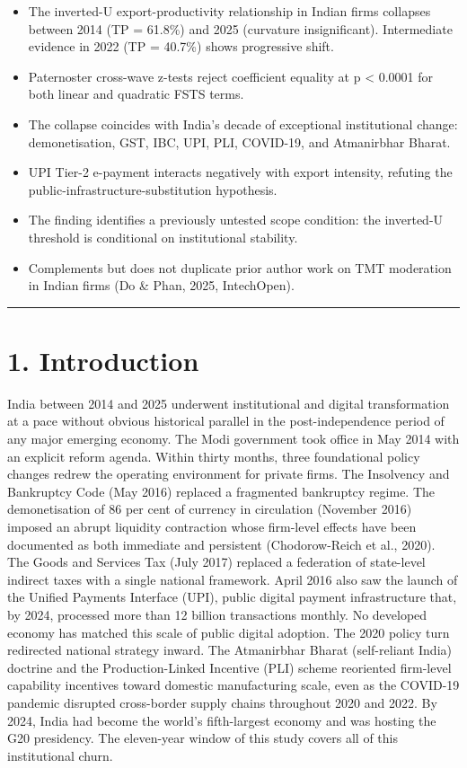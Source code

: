 \documentclass[
  12pt]{article}
\begin{document}
\begin{itemize}
\item
  The inverted-U export-productivity relationship in Indian firms
  collapses between 2014 (TP = 61.8\%) and 2025 (curvature
  insignificant). Intermediate evidence in 2022 (TP = 40.7\%) shows
  progressive shift.
\item
  Paternoster cross-wave z-tests reject coefficient equality at p
  \textless{} 0.0001 for both linear and quadratic FSTS terms.
\item
  The collapse coincides with India's decade of exceptional
  institutional change: demonetisation, GST, IBC, UPI, PLI, COVID-19,
  and Atmanirbhar Bharat.
\item
  UPI Tier-2 e-payment interacts negatively with export intensity,
  refuting the public-infrastructure-substitution hypothesis.
\item
  The finding identifies a previously untested scope condition: the
  inverted-U threshold is conditional on institutional stability.
\item
  Complements but does not duplicate prior author work on TMT moderation
  in Indian firms (Do \& Phan, 2025, IntechOpen).
\end{itemize}

\begin{center}\rule{0.5\linewidth}{0.5pt}\end{center}

\hypertarget{introduction}{%
\section{1. Introduction}\label{introduction}}

India between 2014 and 2025 underwent institutional and digital
transformation at a pace without obvious historical parallel in the
post-independence period of any major emerging economy. The Modi
government took office in May 2014 with an explicit reform agenda.
Within thirty months, three foundational policy changes redrew the
operating environment for private firms. The Insolvency and Bankruptcy
Code (May 2016) replaced a fragmented bankruptcy regime. The
demonetisation of 86 per cent of currency in circulation (November 2016)
imposed an abrupt liquidity contraction whose firm-level effects have
been documented as both immediate and persistent (Chodorow-Reich et al.,
2020). The Goods and Services Tax (July 2017) replaced a federation of
state-level indirect taxes with a single national framework. April 2016
also saw the launch of the Unified Payments Interface (UPI), public
digital payment infrastructure that, by 2024, processed more than 12
billion transactions monthly. No developed economy has matched this
scale of public digital adoption. The 2020 policy turn redirected
national strategy inward. The Atmanirbhar Bharat (self-reliant India)
doctrine and the Production-Linked Incentive (PLI) scheme reoriented
firm-level capability incentives toward domestic manufacturing scale,
even as the COVID-19 pandemic disrupted cross-border supply chains
throughout 2020 and 2022. By 2024, India had become the world's
fifth-largest economy and was hosting the G20 presidency. The
eleven-year window of this study covers all of this institutional churn.
\end{document}
